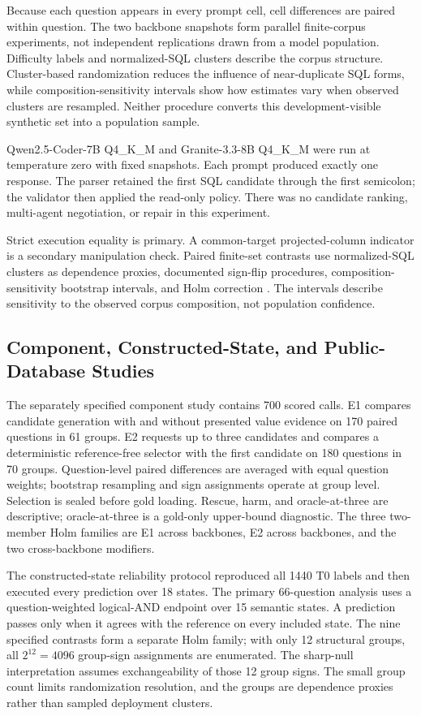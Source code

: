 \documentclass[applsci,article,submit,moreauthors]{Definitions/mdpi}
\begin{document}
Because each question appears in every prompt cell, cell differences are paired within question. The two backbone snapshots form parallel finite-corpus experiments, not independent replications drawn from a model population. Difficulty labels and normalized-SQL clusters describe the corpus structure. Cluster-based randomization reduces the influence of near-duplicate SQL forms, while composition-sensitivity intervals show how estimates vary when observed clusters are resampled. Neither procedure converts this development-visible synthetic set into a population sample.

Qwen2.5-Coder-7B Q4\_K\_M and Granite-3.3-8B Q4\_K\_M were run at temperature zero with fixed snapshots. Each prompt produced exactly one response. The parser retained the first SQL candidate through the first semicolon; the validator then applied the read-only policy. There was no candidate ranking, multi-agent negotiation, or repair in this experiment.

Strict execution equality is primary. A common-target projected-column indicator is a secondary manipulation check. Paired finite-set contrasts use normalized-SQL clusters as dependence proxies, documented sign-flip procedures, composition-sensitivity bootstrap intervals, and Holm correction \cite{cameron2008bootstrap,canay2017randomization,holm1979simple}. The intervals describe sensitivity to the observed corpus composition, not population confidence.

\subsection{Component, Constructed-State, and Public-Database Studies}

The separately specified component study contains 700 scored calls. E1 compares candidate generation with and without presented value evidence on 170 paired questions in 61 groups. E2 requests up to three candidates and compares a deterministic reference-free selector with the first candidate on 180 questions in 70 groups. Question-level paired differences are averaged with equal question weights; bootstrap resampling and sign assignments operate at group level. Selection is sealed before gold loading. Rescue, harm, and oracle-at-three are descriptive; oracle-at-three is a gold-only upper-bound diagnostic. The three two-member Holm families are E1 across backbones, E2 across backbones, and the two cross-backbone modifiers.

The constructed-state reliability protocol reproduced all 1440 T0 labels and then executed every prediction over 18 states. The primary 66-question analysis uses a question-weighted logical-AND endpoint over 15 semantic states. A prediction passes only when it agrees with the reference on every included state. The nine specified contrasts form a separate Holm family; with only 12 structural groups, all $2^{12}=4096$ group-sign assignments are enumerated. The sharp-null interpretation assumes exchangeability of those 12 group signs. The small group count limits randomization resolution, and the groups are dependence proxies rather than sampled deployment clusters.
\end{document}
